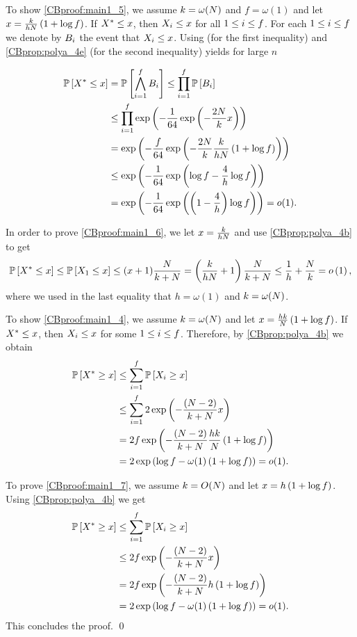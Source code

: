 To show \ref{CBproof:main1_5}, we assume $k=\omega(N)$ and $f=\omega(1)$ and let $x=\frac{k}{hN}\left(1+\log f\right)$. If ${X^*} \leq x$, then $X_i \leq x$ for all $1\leq i \leq f$. For each $1\leq i \leq f$ we denote by $B_i$ the event that $X_i\leq x$. Using  (for the first inequality) and \ref{CBprop:polya_4e} (for the second inequality) yields for large $n$

\begin{align*}
\mathbb{P}\left[{X^*} \leq x\right]
&= \mathbb{P}\left[\bigwedge_{i=1}^{f} B_i\right] 
\leq \prod_{i=1}^{f}\mathbb{P}\left[B_i\right]
\\
&\leq \prod_{i=1}^{f}\exp \left(-\frac{1}{64}\exp\left(-\frac{2N }{k}x\right)\right)
\\
&=\exp \left(-\frac{f}{64}\exp\left(-\frac{2N}{k}\frac{k}{hN}\left(1+\log f\right)\right)\right)
\\
&\leq \exp\left(-\frac{1}{64}\exp\left(\log f-\frac{4}{h}\log f\right)\right)
\\
&=\exp\left(-\frac{1}{64}\exp\left(\left(1-\frac{4}{h}\right)\log f\right)\right)
=o(1).
\end{align*}

In order to prove \ref{CBproof:main1_6}, we let $x=\frac{k}{hN}$ and use \ref{CBprop:polya_4b} to get
\begin{align*}
\mathbb{P}\left[{X^*} \leq x\right]\leq \mathbb{P}\left[X_1 \leq x\right]\leq (x+1) \frac{N}{k+N}=\left(\frac{k}{hN}+1\right)\frac{N}{k+N}\leq\frac{1}{h}+\frac{N}{k}=o\left(1\right),
\end{align*}
where we used in the last equality that $h=\omega(1)$ and $k=\omega(N)$.

To show \ref{CBproof:main1_4}, we assume $k=\omega(N)$ and let $x=\frac{hk}{N}\left(1+\log f\right)$. If ${X^*} \leq x$, then $X_i \leq x$ for some $1\leq i \leq f$. Therefore, by \ref{CBprop:polya_4b} we obtain
\begin{align*}
\mathbb{P}\left[{X^*} \geq x\right]&\leq \sum_{i=1}^{f}\mathbb{P}\left[X_i \geq x\right]
\\
&\leq \sum_{i=1}^{f} 2\exp\left(-\frac{(N-2)}{k+N}x\right)
\\
&=2f\exp\left(-\frac{(N-2)}{k+N}\frac{hk}{N}\left(1+\log f\right)\right)
\\
&=2\exp\left(\log f-\omega(1)\left(1+\log f\right)\right)=o(1).
\end{align*}

To prove \ref{CBproof:main1_7}, we assume $k=O(N)$ and let $x=h\left(1+\log f\right)$. Using \ref{CBprop:polya_4b} we get
\begin{align*}
\mathbb{P}\left[{X^*} \geq x\right]&\leq \sum_{i=1}^{f}\mathbb{P}\left[X_i\geq x\right]
\\
&\leq 2f \exp\left(-\frac{\left(N-2\right)}{k+N} x\right)
\\
&=2f \exp\left(-\frac{\left(N-2\right)}{k+N} h\left(1+\log f\right)\right)
\\
&=2\exp\left(\log f-\omega(1)\left(1+\log f\right)\right)=o(1).
\end{align*}
This concludes the proof. \qed

